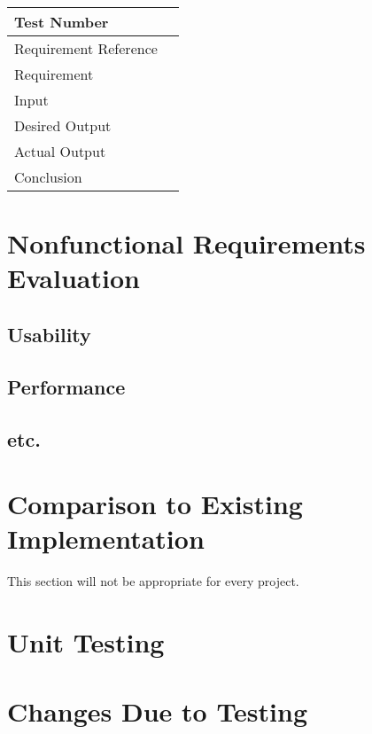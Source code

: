 \documentclass[12pt, titlepage]{article}
\begin{document}
\begin{table}[h]
\begin{center}
\begin{tabular}{|l | l|}
\hline
  Test Number & \\
  \hline
  Requirement Reference & \\
  \hline
  Requirement &  \\
  \hline
  Input & \\
  \hline
  Desired Output & \\
  \hline
  Actual Output & \\
  \hline
  Conclusion & \\
  \hline
\end{tabular}
\end{center}           
\end{table}

\section{Nonfunctional Requirements Evaluation}

\subsection{Usability}
		
\subsection{Performance}

\subsection{etc.}
	
\section{Comparison to Existing Implementation}	

This section will not be appropriate for every project.

\section{Unit Testing}

\section{Changes Due to Testing}
\end{document}
